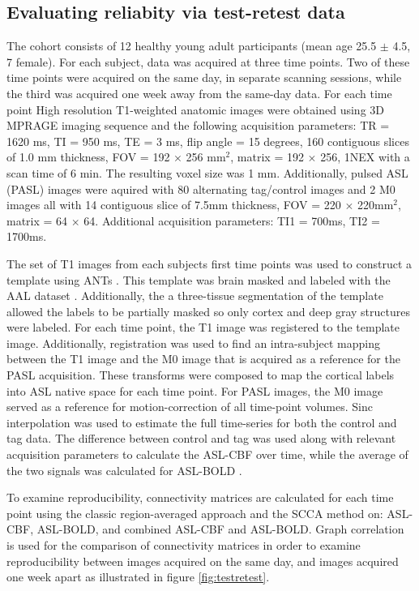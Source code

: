 \documentclass{llncs}
\begin{document}
\subsection{Evaluating reliabity via test-retest data}
 The cohort consists of 12 healthy young adult participants  (mean age 25.5 $\pm$ 4.5, 7 female). For each subject, data was acquired at three time points. Two of these time points were acquired on the same day, in separate scanning sessions, while the third was acquired one week away from the same-day data.  For each time point High resolution T1-weighted anatomic images were obtained using 3D MPRAGE imaging sequence and the following acquisition parameters: TR = 1620 ms, TI = 950 ms, TE = 3 ms, flip angle = 15 degrees, 160 contiguous slices of 1.0 mm thickness, FOV = 192 $\times$ 256 mm$^2$, matrix = 192 $\times$ 256, 1NEX with a scan time of 6 min. The resulting voxel size was 1 mm.  Additionally, pulsed ASL (PASL) images were aquired with 80 alternating tag/control images and 2 M0 images all with 14 contiguous slice of 7.5mm thickness, FOV = 220 $\times$ 220mm$^2$, matrix = 64 $\times$ 64. Additional acquisition parameters: TI1 = 700ms, TI2 = 1700ms.

 The set of T1 images from each subjects first time points was used to construct a template using ANTs \cite{Avants2011}. This template was brain masked and labeled with the AAL dataset \cite{Tzourio-Mazoyer2002}. Additionally, the a three-tissue segmentation of the template allowed the labels to be partially masked so only cortex and deep gray structures were labeled. For each time point, the T1 image was registered to the template image. Additionally, registration was used to find an intra-subject mapping between the T1 image and the M0 image that is acquired as a reference for the PASL acquisition. These transforms were composed to map the cortical labels into ASL native space for each time point. For PASL images, the M0 image served as a reference for motion-correction of all time-point volumes. Sinc interpolation was used to estimate the full time-series for both the control and tag data. The difference between control and tag was used along with relevant acquisition parameters to calculate the ASL-CBF over time, while the average of the two signals was calculated for ASL-BOLD \cite{Wong1997}. 

 To examine reproducibility, connectivity matrices are calculated for each time point using the classic region-averaged approach and the SCCA method on: ASL-CBF, ASL-BOLD, and combined ASL-CBF and ASL-BOLD. Graph correlation \cite{vanWijk2010} is used for the comparison of connectivity matrices in order to examine reproducibility between images acquired on the same day, and images acquired one week apart as illustrated in figure \ref{fig:testretest}.
\end{document}

